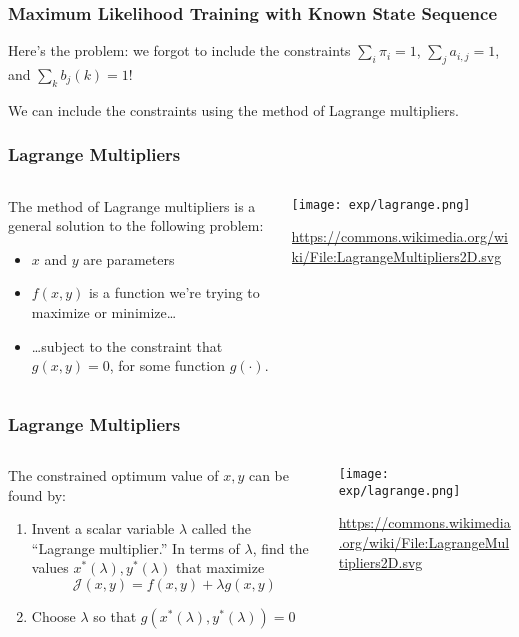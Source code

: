 \documentclass{beamer}
\begin{document}
\begin{frame}
  \frametitle{Maximum Likelihood Training with Known State Sequence}

  Here's the problem: we forgot to include the constraints
  $\sum_i\pi_i=1$, $\sum_j a_{i,j}=1$, and $\sum_k b_j(k)=1$!

  We can include the constraints using the method of Lagrange
  multipliers.
\end{frame}

\begin{frame}
  \frametitle{Lagrange Multipliers}
  \begin{columns}
    \begin{column}{0.5\textwidth}
      The method of Lagrange multipliers is a general solution to the
      following problem:
      \begin{itemize}
      \item $x$ and $y$ are  parameters
      \item $f(x,y)$ is a function we're trying to maximize or minimize\ldots
      \item \ldots subject to the constraint that $g(x,y)=0$,
        for some function $g(\cdot)$.
      \end{itemize}
    \end{column}
    \begin{column}{0.5\textwidth}
      \centerline{\texttt{[image: exp/lagrange.png]}}

      \url{https://commons.wikimedia.org/wiki/File:LagrangeMultipliers2D.svg}
    \end{column}
  \end{columns}
\end{frame}

\begin{frame}
  \frametitle{Lagrange Multipliers}
  \begin{columns}
    \begin{column}{0.5\textwidth}
      The constrained optimum value of $x,y$ can be found by:
      \begin{enumerate}
      \item Invent a scalar variable $\lambda$ called the ``Lagrange
        multiplier.''  In terms of $\lambda$, find the values
        $x^*(\lambda),y^*(\lambda)$ that maximize
        \begin{displaymath}
          \mathcal{J}(x,y)=f(x,y)+\lambda g(x,y)
        \end{displaymath}
      \item Choose $\lambda$ so that $g(x^*(\lambda),y^*(\lambda))=0$
      \end{enumerate}
    \end{column}
    \begin{column}{0.5\textwidth}
      \centerline{\texttt{[image: exp/lagrange.png]}}

      \url{https://commons.wikimedia.org/wiki/File:LagrangeMultipliers2D.svg}
    \end{column}
  \end{columns}
\end{frame}
\end{document}
